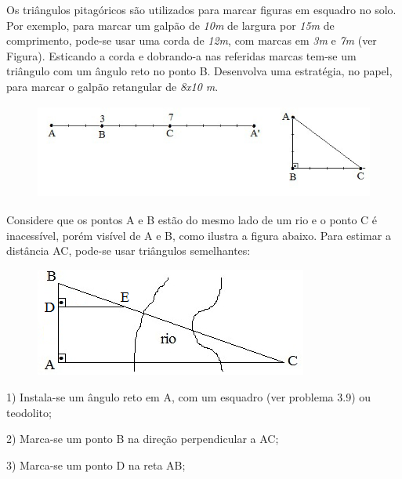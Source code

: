 \begin{exercicios}
\item Os triângulos pitagóricos são utilizados para marcar figuras em esquadro no solo. Por exemplo, para marcar um galpão de \textit{10m} de largura por \textit{15m} de comprimento, pode-se usar uma corda de \textit{12m}, com marcas em \textit{3m} e \textit{7m} (ver Figura). Esticando a corda e dobrando-a nas referidas marcas tem-se um triângulo com um ângulo reto no ponto B. Desenvolva uma estratégia, no papel, para marcar o galpão retangular de \textit{8x10 m}.

\begin{figure}[H]
    \begin{Center}
        \includegraphics[width=4.78in,height=1.23in]{capitulos/trigonometria_e_funcoes_trigonometricas/media/image18.png}
    \end{Center}
\end{figure}

\exitem{} Considere que os pontos A e B estão do mesmo lado de um rio e o ponto C é inacessível, porém visível de A e B, como ilustra a figura abaixo. Para estimar a distância AC, pode-se usar triângulos semelhantes:

\begin{figure}[H]
    \begin{Center}
        \includegraphics[width=3.53in,height=1.4in]{capitulos/trigonometria_e_funcoes_trigonometricas/media/image19.png}
    \end{Center}
\end{figure}

1\degree) Instala-se um ângulo reto em A, com um esquadro (ver problema 3.9) ou teodolito;

2\degree) Marca-se um ponto B na direção perpendicular a AC;

3\degree) Marca-se um ponto D na reta AB;


\end{exercicios}
